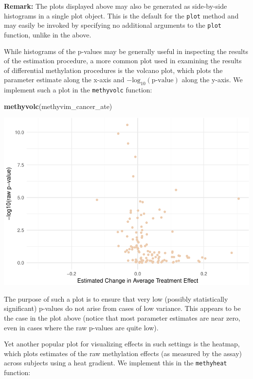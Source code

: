 \documentclass[9pt,a4paper,]{extarticle}
\newenvironment{Shaded}{\begin{snugshade}}{\end{snugshade}}
\newcommand{\KeywordTok}[1]{\textcolor[rgb]{0.13,0.29,0.53}{\textbf{#1}}}
\newcommand{\NormalTok}[1]{#1}
\theoremstyle{definition}
\theoremstyle{definition}
\theoremstyle{definition}
\theoremstyle{remark}
\begin{document}
\textbf{Remark:} The plots displayed above may also be generated as
side-by-side histograms in a single plot object. This is the default for
the \texttt{plot} method and may easily be invoked by specifying no
additional arguments to the \texttt{plot} function, unlike in the above.

While histograms of the p-values may be generally useful in inspecting
the results of the estimation procedure, a more common plot used in
examining the results of differential methylation procedures is the
volcano plot, which plots the parameter estimate along the x-axis and
\(-\text{log}_{10}(\text{p-value})\) along the y-axis. We implement such
a plot in the \texttt{methyvolc} function:

\begin{Shaded}
\begin{Highlighting}[]
\KeywordTok{methyvolc}\NormalTok{(methyvim_cancer_ate)}
\end{Highlighting}
\end{Shaded}

\includegraphics{paper_BiocF1000_files/figure-latex/methyvim-volcano-1.pdf}

The purpose of such a plot is to ensure that very low (possibly
statistically significant) p-values do not arise from cases of low
variance. This appears to be the case in the plot above (notice that
most parameter estimates are near zero, even in cases where the raw
p-values are quite low).

Yet another popular plot for visualizing effects in such settings is the
heatmap, which plots estimates of the raw methylation effects (as
measured by the assay) across subjects using a heat gradient. We
implement this in the \texttt{methyheat} function:
\end{document}
